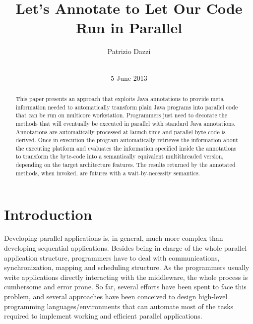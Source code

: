 \documentclass{acm_proc_article-sp}
\begin{document}
\title{Let's Annotate to Let Our Code Run in Parallel}


 \author{
\alignauthor
Patrizio Dazzi\\
       \\
}

\date{5 June 2013}

\maketitle
\begin{abstract}

This paper presents an approach that exploits Java annotations to provide meta information needed to automatically transform plain Java programs into parallel code that can be run on multicore workstation. Programmers just need to decorate the methods that will eventually be executed in parallel with standard Java annotations. Annotations are automatically processed at launch-time and parallel byte code is derived. Once in execution the program automatically retrieves the information about the executing platform and evaluates the information specified inside the annotations to transform the byte-code into a semantically equivalent multithreaded version, depending on the target architecture features. The results returned by the annotated methods, when invoked, are futures with a wait-by-necessity semantics.

\end{abstract}


\section{Introduction}

Developing parallel applications is, in general, much more complex than developing sequential applications. Besides being in charge of the whole parallel application structure, programmers have to deal with communications, synchronization, mapping and scheduling structure. As the programmers usually write applications directly interacting with the middleware, the whole process is cumbersome and error prone.
So far, several efforts have been spent to face this problem, and several approaches have been conceived to design high-level programming languages/environments that can automate most of the tasks required to implement working and efficient parallel applications.
\end{document}
